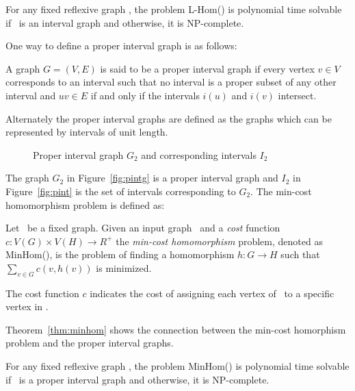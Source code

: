 \begin{theorem}  \label{thm:lhom}
For any fixed reflexive graph \mH, the problem L-Hom(\mH) is polynomial time solvable if
\mH\ is an interval graph and otherwise, it is NP-complete.
\end{theorem}

One way to define a proper interval graph is as follows:

\begin{defi}
A graph \(G=(V,E)\) is said to be a proper interval graph if every vertex \(v \in V\)
corresponds to an interval such that no interval is a proper subset of any other interval
and \(uv \in E\) if and only if the intervals \(i(u)\) and \(i(v)\) intersect.
\end{defi}

Alternately the proper interval graphs are defined as the graphs which can be represented 
by intervals of unit length.

\begin{figure}[h]
\hfill
\subfigure[\ensuremath{G_2}]{\label{fig:pintg}}\hfill 
\subfigure[\ensuremath{I_2}]{\label{fig:pint}}\hfill 
\caption{Proper interval graph \ensuremath{G_2} and corresponding intervals
\ensuremath{I_2}}\label{fig:pintgi}
\end{figure}

The graph \(G_2\) in Figure~\ref{fig:pintg} is a proper interval graph and
\(I_2\) in Figure~\ref{fig:pint} is the set of intervals corresponding to \(G_2\)\@.
The min-cost homomorphism problem is defined as:

\begin{defi} [MinHom]
Let \mH\ be a fixed graph. Given an input graph \mG\ and a \emph{cost} function
\(c: V(G) \times V(H) \to R^+\) the \emph{min-cost homomorphism} problem,
denoted as MinHom(\mH), is the problem of finding a homomorphism 
\(h:G\to H\) such that \(\sum_{v\in G} c(v, h(v))\) is minimized.
\end{defi}

The cost function \(c\) indicates the cost of assigning each vertex of \mG\ 
to a specific vertex in \mH\@. 

Theorem~\ref{thm:minhom} shows the connection between the min-cost homorphism problem 
and the proper interval graphs.

\begin{theorem} [TODO] \label{thm:minhom}
For any fixed reflexive graph \mH, the problem MinHom(\mH) is polynomial time solvable if
\mH\ is a proper interval graph and otherwise, it is NP-complete.
\end{theorem}

